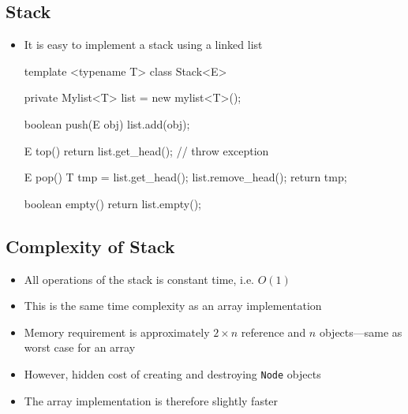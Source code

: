 \begin{slide}
\section[-2]{Stack}

\begin{PauseHighLight}
  \begin{itemize}
  \item It is easy to implement a stack using a linked list\pause
    \begin{java}
template <typename T>
class Stack<E>
{
  private Mylist<T> list = new mylist<T>();

  boolean push(E obj) {list.add(obj);}
  
  E top() {return list.get_head();} // throw exception

  E pop() {
    T tmp = list.get_head();
    list.remove_head();
    return tmp;
  }

  boolean empty() {return list.empty();}
}
    \end{java}
  \end{itemize}
\end{PauseHighLight}

\end{slide}


\begin{slide}
\section{Complexity of Stack}

\begin{PauseHighLight}
  \begin{itemize}
  \item All operations of the stack is constant time, i.e. $O(1)$\pause
  \item This is the same time complexity as an array
    implementation\pause
  \item Memory requirement is approximately $2\times n$ reference and
    $n$ objects\pause---same as worst case for an array\pause
  \item However, hidden cost of creating and destroying \texttt{Node}
    objects\pause
  \item The array implementation is therefore slightly faster\pause
  \end{itemize}
\end{PauseHighLight}

\end{slide}


